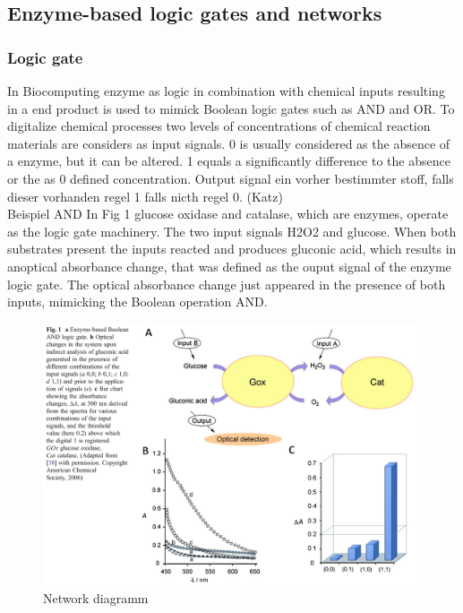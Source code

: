 \documentclass[runningheads]{llncs}
\begin{document}
\subsection{Enzyme-based logic gates and networks}
	
	\subsubsection{Logic gate}
	
	In Biocomputing enzyme as logic in combination with chemical inputs resulting in a end product is used to mimick Boolean logic gates such as AND and OR. To digitalize chemical processes two levels of concentrations of chemical reaction materials are considers as input signals. 0 is usually considered as the absence of a enzyme, but it can be altered. 1 equals a  significantly difference to the absence or the as 0 defined concentration.
	Output signal ein vorher bestimmter stoff, falls dieser vorhanden regel 1 falls nicth regel 0.  
	(Katz) \\
	
	Beispiel AND 
	In Fig 1 glucose oxidase and catalase, which are enzymes, operate as the logic gate machinery. The two input signals H2O2 and glucose. When both substrates present the inputs reacted and produces gluconic acid, which results in anoptical absorbance change, that was defined as the ouput signal of the enzyme logic gate. The optical absorbance change just appeared in the presence of both inputs, mimicking the Boolean operation AND. 

	\begin{figure} \centering \includegraphics[scale= 0.3]{AND.png} \caption{Network diagramm} \label{img:and} \end{figure}
	
\end{document}
